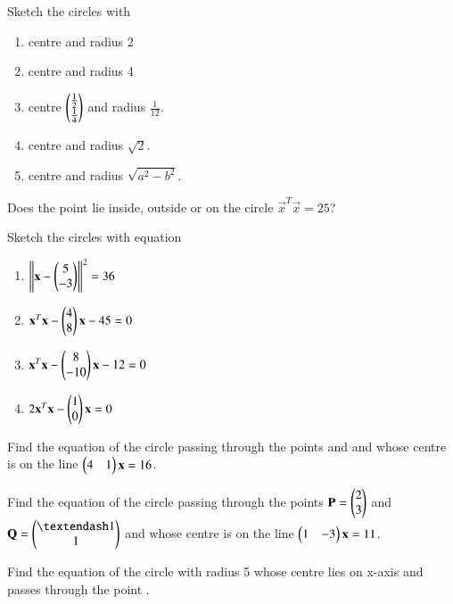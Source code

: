 \solution 

\item Sketch the circles with 
\begin{enumerate}
\item centre  and radius 2
\item centre  and radius 4
\item centre $\begin{pmatrix}\frac{1}{2}\\ \frac{1}{4}\end{pmatrix}$ and radius $\frac{1}{12}$.
\item centre  and radius $\sqrt{2}$.
\item centre  and radius $\sqrt{a^2-b^2}$.
\end{enumerate}
\solution 

\item  Does the point  lie inside, outside or on the circle $\vec{x}^T\vec{x} = 25$?
\\
\solution 

\item Sketch the circles with equation
\begin{enumerate}
\item $\left\lVert\mathbf{x}-\begin{pmatrix}5\\-3\end{pmatrix}\right\rVert^2 = 36$
\item $\mathbf{x}^T\mathbf{x}-\begin{pmatrix}4\\8\end{pmatrix}\mathbf{x} -45= 0$
\item $\mathbf{x}^T\mathbf{x}-\begin{pmatrix}8\\-10\end{pmatrix}\mathbf{x} -12= 0$
\item $2\mathbf{x}^T\mathbf{x}-\begin{pmatrix}1\\0\end{pmatrix}\mathbf{x} = 0$
\end{enumerate}
\solution 

\item Find the equation of the circle passing through the points  and  and whose centre is on the line $\begin{pmatrix}4 & 1\end{pmatrix}\mathbf{x} = 16$.
\\
\solution 

\item Find the equation of the circle passing through the points $\mathbf{P} =\begin{pmatrix}2\\3\end{pmatrix}$ and $\vec{Q} = \myvec{–1\\1}$ and whose centre is on the line $\begin{pmatrix}1 & -3\end{pmatrix}\mathbf{x} = 11$.
\solution 

\item Find the equation of the circle with radius 5 whose centre lies on x-axis and passes through the point .
\\
\solution


